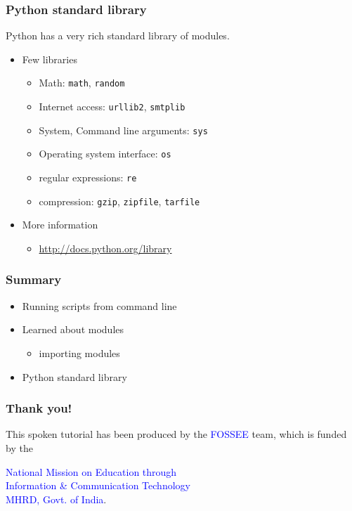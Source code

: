\documentclass[presentation]{beamer}
\begin{document}
\begin{frame}
\frametitle{Python standard library}
\label{sec-12}

  Python has a very rich standard library of modules.
\begin{itemize}
\item Few libraries

\begin{itemize}
\item Math: \texttt{math}, \texttt{random}
\item Internet access: \texttt{urllib2}, \texttt{smtplib}
\item System, Command line arguments: \texttt{sys}
\item Operating system interface: \texttt{os}
\item regular expressions: \texttt{re}
\item compression: \texttt{gzip}, \texttt{zipfile}, \texttt{tarfile}
\end{itemize}

\item More information

\begin{itemize}
\item \href{http://docs.python.org/library}{http://docs.python.org/library}
\end{itemize}

\end{itemize}
\end{frame}
\begin{frame}
\frametitle{Summary}
\label{sec-13}

\begin{itemize}
\item Running scripts from command line
\item Learned about modules

\begin{itemize}
\item importing modules
\end{itemize}

\item Python standard library
\end{itemize}
\end{frame}
\begin{frame}
\frametitle{Thank you!}
\label{sec-14}

  \begin{block}{}
  \begin{center}
  This spoken tutorial has been produced by the
  \textcolor{blue}{FOSSEE} team, which is funded by the 
  \end{center}
  \begin{center}
    \textcolor{blue}{National Mission on Education through \\
      Information \& Communication Technology \\ 
      MHRD, Govt. of India}.
  \end{center}  
  \end{block}
\end{frame}
\end{document}

